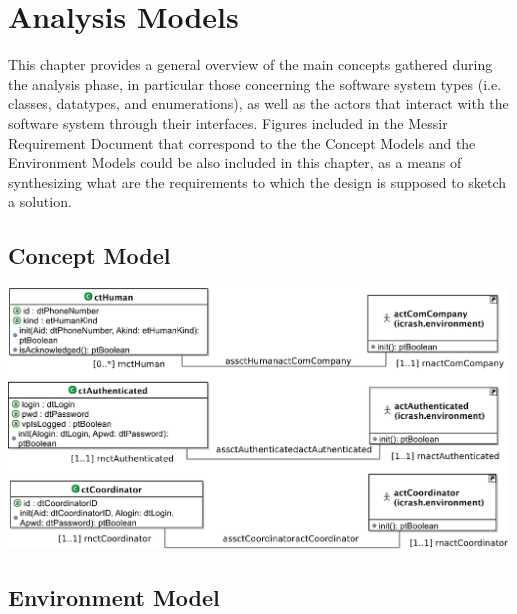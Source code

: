 \chapter{Analysis Models}
\label{chap:AM}

This chapter provides a general overview of the main concepts gathered during
the analysis phase, in particular those concerning the software system types
(i.e. classes, datatypes, and enumerations), as well as the actors that interact
with the software system through their interfaces. Figures included in the
Messir Requirement Document that correspond to the  the \glspl{Concept Model} and the \glspl{Environment
Model} could be also included in this chapter, as a means of synthesizing what
are the requirements to which the design is supposed to sketch a solution.




\section{Concept Model}
 \includegraphics[width=500px]{images/analysis/concept-model/global/PrimaryTypes-Classes/01/cm-pt-ct-gv-01.eps}



   

\section{Environment Model}
